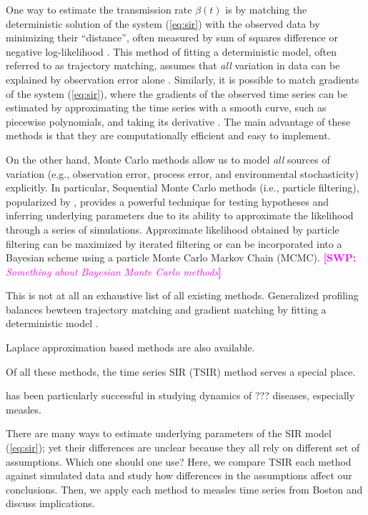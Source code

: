 \documentclass{article}
\newcommand{\eref}[1]{(\ref{eq:#1})}
\newcommand{\comment}[3]{\textcolor{#1}{\textbf{[#2: }\textsl{#3}\textbf{]}}}
\newcommand{\swp}[1]{\comment{magenta}{SWP}{#1}}
\begin{document}
One way to estimate the transmission rate $\beta(t)$ is by matching the deterministic solution of the system \eref{sir} with the observed data by minimizing their ``distance'', often measured by sum of squares difference or negative log-likelihood \citep{riley2003transmission, chowell2004basic}.
This method of fitting a deterministic model, often referred to as trajectory matching, assumes that \emph{all} variation in data can be explained by observation error alone \citep{bolker2008ecological}.
Similarly, it is possible to match gradients of the system \eref{sir}, where the gradients of the observed time series can be estimated by approximating the time series with a smooth curve, such as piecewise polynomials, and taking its derivative \citep{ellner2002fitting}.
The main advantage of these methods is that they are computationally efficient and easy to implement.

On the other hand, Monte Carlo methods allow us to model \emph{all} sources of variation (e.g., observation error, process error, and environmental stochasticity) explicitly.
In particular, Sequential Monte Carlo methods (i.e., particle filtering), popularized by \cite{king2015statistical}, provides a powerful technique for testing hypotheses and inferring underlying parameters due to its ability to approximate the likelihood through a series of simulations.
Approximate likelihood obtained by particle filtering can be maximized by iterated filtering \citep{ionides2011iterated, ionides2015inference} or can be incorporated into a Bayesian scheme using a particle Monte Carlo Markov Chain (MCMC).
\swp{Something about Bayesian Monte Carlo methods}

This is not at all an exhaustive list of all existing methods.
Generalized profiling balances bewteen trajectory matching and gradient matching by fitting a deterministic model  \citep{hooker2010parameterizing}.

Laplace approximation based methods are also available.


Of all these methods, the time series SIR (TSIR) method serves a special place.

has been particularly successful in studying dynamics of ??? diseases, especially measles.


There are many ways to estimate underlying parameters of the SIR model \eref{sir};
yet their differences are unclear because they all rely on different set of assumptions.
Which one should one use?
Here, we compare TSIR each method against simulated data and study how differences in the assumptions affect our conclusions.
Then, we apply each method to measles time series from Boston and discuss implications.
\end{document}
